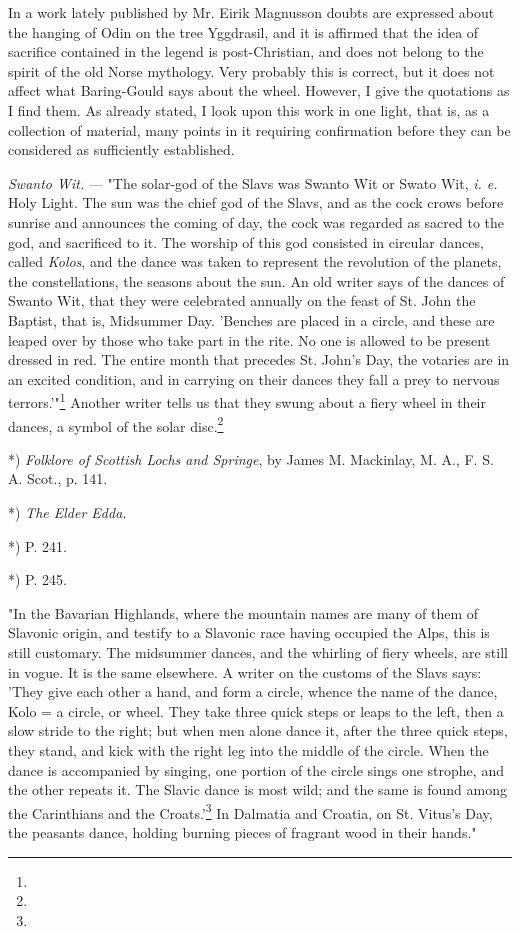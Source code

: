 \documentclass[a4paper, 11pt, oneside, polutonikogreek, english]{article}
\begin{document}
In a work lately published by Mr. Eirik Magnusson doubts are expressed about the hanging of Odin on the tree Yggdrasil, and it is affirmed that the idea of sacrifice contained in the legend is post-Christian, and does not belong to the spirit of the old Norse mythology. Very probably this is correct, but it does not affect what Baring-Gould says about the wheel. However, I give the quotations as I find them. As already stated, I look upon this work in one light, that is, as a collection of material, many points in it requiring confirmation before they can be considered as sufficiently established.

\emph{Swanto Wit.} --- "The solar-god of the Slavs was Swanto Wit or Swato Wit, \emph{i. e.} Holy Light. The sun was the chief god of the Slavs, and as the cock crows before sunrise and announces the coming of day, the cock was regarded as sacred to the god, and sacrificed to it. The worship of this god consisted in circular dances, called \emph{Kolos}, and the dance was taken to represent the revolution of the planets, the constellations, the seasons about the sun. An old writer says of the dances of Swanto Wit, that they were celebrated annually on the feast of St. John the Baptist, that is, Midsummer Day. 'Benches are placed in a circle, and these are leaped over by those who take part in the rite. No one is allowed to be present dressed in red. The entire month that precedes St. John's Day, the votaries are in an excited condition, and in carrying on their dances they fall a prey to nervous terrors.'"\footnote{} Another writer tells us that they swung about a fiery wheel in their dances, a symbol of the solar disc.\footnote{}

*) \emph{Folklore of Scottish Lochs and Springe}, by James M. Mackinlay, M. A., F. S. A. Scot., p. 141.

*) \emph{The Elder Edda.}

*) P. 241.

*) P. 245.

"In the Bavarian Highlands, where the mountain names are many of them of Slavonic origin, and testify to a Slavonic race having occupied the Alps, this is still customary. The midsummer dances, and the whirling of fiery wheels, are still in vogue. It is the same elsewhere. A writer on the customs of the Slavs says: 'They give each other a hand, and form a circle, whence the name of the dance, Kolo = a circle, or wheel. They take three quick steps or leaps to the left, then a slow stride to the right; but when men alone dance it, after the three quick steps, they stand, and kick with the right leg into the middle of the circle. When the dance is accompanied by singing, one portion of the circle sings one strophe, and the other repeats it. The Slavic dance is most wild; and the same is found among the Carinthians and the Croats.'\footnote{} In Dalmatia and Croatia, on St. Vitus's Day, the peasants dance, holding burning pieces of fragrant wood in their hands."
\end{document}
